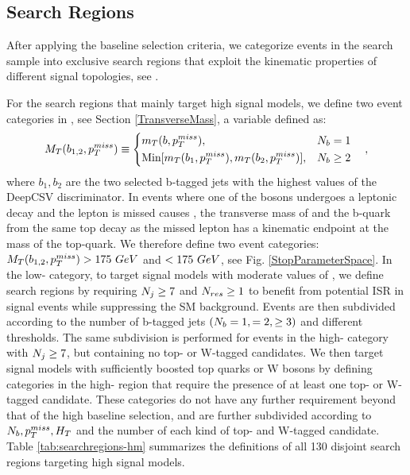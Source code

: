 \subsection{Search Regions}\label{SearchRegions}

After applying the baseline selection criteria, we categorize events in the search sample into exclusive search regions that exploit the kinematic properties of different signal topologies, see \cite{cms_collaboration_search_2016, alwall_simplified_2009, alwall_model-independent_2009}. 

For the search regions that mainly target high \dm{} signal models, we define two event categories in \mtb, see Section \ref{TransverseMass}, a variable defined as:
\begin{equation}
M_{T}(b_{1,2},p_{T}^{miss})\equiv
\begin{cases}
\begin{split}
& m_T(b,p_{T}^{miss}), &N_{b}=1 \\
& \text{Min}[m_T(b_1, p_{T}^{miss}),m_T(b_2,p_{T}^{miss})], &N_{b}\geq2 \\
\end{split}
\end{cases},
\end{equation}
where $b_1, b_2$ are the two selected b-tagged jets with the highest values of the DeepCSV discriminator. In \ttbar{} events where one of the \W{} bosons undergoes a leptonic decay and the lepton is missed causes \met{}, the transverse mass of \met{} and the b-quark from the same top decay as the missed lepton has a kinematic endpoint at the mass of the top-quark. We therefore define two event categories: $M_{T}(b_{1,2},p_{T}^{miss})>175~GeV$ and $< 175~GeV$, see Fig. \ref{StopParameterSpace}. In the low-\mtb{} category, to target signal models with moderate values of \dm, we define search regions by requiring $N_{j}\geq7$ and $N_{res}\geq1$ to benefit from potential ISR in signal events while suppressing the SM background. Events are then subdivided according to the number of b-tagged jets $(N_{b}=1,=2,\geq3)$ and different \met{} thresholds. The same subdivision is performed for events in the high-\mtb{} category with $N_{j}\geq7$, but containing no top- or W-tagged candidates. We then target signal models with sufficiently boosted top quarks or W bosons by defining categories in the high-\mtb{} region that require the presence of at least one top- or W-tagged candidate. These categories do not have any further \nj{} requirement beyond that of the high \dm{} baseline selection, and are further subdivided according to $N_{b}, p_{T}^{miss}, H_{T}$ and the number of each kind of top- and W-tagged candidate. Table \ref{tab:searchregions-hm} summarizes the definitions of all 130 disjoint search regions targeting high \dm{} signal models.

